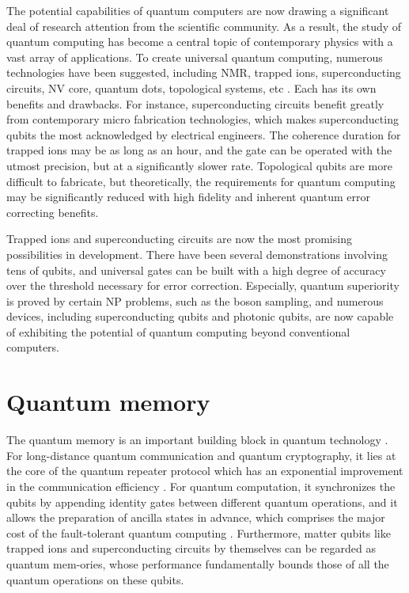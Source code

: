 The potential capabilities of quantum computers \cite{Benioff1980,Feynman1982} are now drawing a significant deal of research attention from the scientific community. As a result, the study of quantum computing has become a central topic of contemporary physics with a vast array of applications. To create universal quantum computing, numerous technologies have been suggested, including NMR, trapped ions, superconducting circuits, NV core, quantum dots, topological systems, etc \cite{Ladd2010}. Each has its own benefits and drawbacks. For instance, superconducting circuits benefit greatly from contemporary micro fabrication technologies, which makes superconducting qubits the most acknowledged by electrical engineers. The coherence duration for trapped ions may be as long as an hour, and the gate can be operated with the utmost precision, but at a significantly slower rate. Topological qubits are more difficult to fabricate, but theoretically, the requirements for quantum computing may be significantly reduced with high fidelity and inherent quantum error correcting benefits.

Trapped ions and superconducting circuits are now the most promising possibilities in development. There have been several demonstrations involving tens of qubits, and universal gates can be built with a high degree of accuracy over the threshold necessary for error correction. Especially, quantum superiority is proved by certain NP problems, such as the boson sampling, and numerous devices, including superconducting qubits and photonic qubits, are now capable of exhibiting the potential of quantum computing beyond conventional computers.


\section{Quantum memory}

The quantum memory is an important building block in quantum technology \cite{lvovsky2009optical}. For long-distance quantum communication and quantum cryptography, it lies at the core of the quantum repeater protocol which has an exponential improvement in the communication efficiency \cite{duan2001long, sangouard2011quantum}. For quantum computation, it synchronizes the qubits by appending identity gates between different quantum operations, and it allows the preparation of ancilla states in advance, which comprises the major cost of the fault-tolerant quantum computing \cite{gottesman1998theory,campbell2017roads}. Furthermore, matter qubits like trapped ions and superconducting circuits \cite{huang2020superconducting} by themselves can be regarded as quantum mem-ories, whose performance fundamentally bounds those of all the quantum operations on these qubits.

